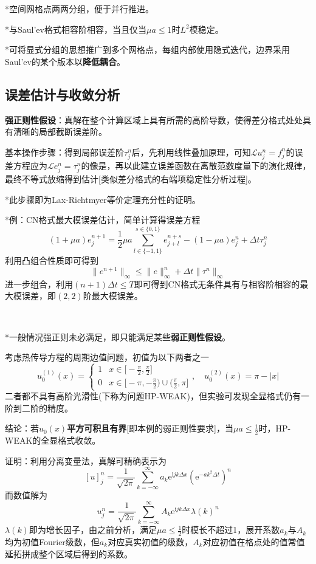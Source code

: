 \documentclass[a4paper,UTF8,fontset=windows]{ctexart}
\begin{document}
*空间网格点两两分组，便于并行推进。

*与Saul'ev格式相容阶相容，当且仅当$\mu a\le1$时$L^2$模稳定。

*可将显式分组的思想推广到多个网格点，每组内部使用隐式迭代，边界采用Saul'ev的某个版本以\textbf{降低耦合}。

\subsection{误差估计与收敛分析}
\textbf{强正则性假设}：真解在整个计算区域上具有所需的高阶导数，使得差分格式处处具有清晰的局部截断误差阶。

基本操作步骤：得到局部误差阶$\tau_j^n$后，先利用线性叠加原理，可知$\mathcal{L}u_j^n=f_j^n$的误差方程应为$\mathcal{L}e_j^n=\tau_j^n$的像是，再以此建立误差函数在离散范数度量下的演化规律，最终不等式放缩得到估计[类似差分格式的右端项稳定性分析过程]。

*此步骤即为Lax-Richtmyer等价定理充分性的证明。

*例：CN格式最大模误差估计，简单计算得误差方程
$$(1+\mu a)e_j^{n+1}=\frac{1}{2}\mu a\sum_{l\in\{-1,1\}}^{s\in\{0,1\}}e_{j+l}^{n+s}-(1-\mu a)e_j^n+\Delta t\tau_j^n$$
利用凸组合性质即可得到
$$\|e^{n+1}\|_\infty\le\|e\|^n_\infty+\Delta t\|\tau^n\|_\infty$$
进一步组合，利用$(n+1)\Delta t\le T$即可得到CN格式无条件具有与相容阶相容的最大模误差，即$(2,2)$阶最大模误差。

\

*一般情况强正则未必满足，即只能满足某些\textbf{弱正则性假设}。

考虑热传导方程的周期边值问题，初值为以下两者之一
$$u_0^{(1)}(x)=\begin{cases}1&x\in\big[-\frac{\pi}{2},\frac{\pi}{2}\big]\\0&x\in\big[-\pi,-\frac{\pi}{2}\big)\cup\big(\frac{\pi}{2},\pi\big]\end{cases},\quad u_0^{(2)}(x)=\pi-|x|$$
二者都不具有高阶光滑性(下称为问题HP-WEAK)，但实验可发现全显格式仍有一阶到二阶的精度。

结论：若$u_0(x)$\textbf{平方可积且有界}[即本例的弱正则性要求]，当$\mu a\le\frac{1}{2}$时，HP-WEAK的全显格式收敛。

证明：利用分离变量法，真解可精确表示为
$$[u]_j^n=\frac{1}{\sqrt{2\pi}}\sum_{k=-\infty}^\infty a_k\mathrm{e}^{\mathrm{i}jk\Delta x}(\mathrm{e}^{-ak^2\Delta t})^n$$
而数值解为
$$u_j^n=\frac{1}{\sqrt{2\pi}}\sum_{k=-\infty}^\infty A_k\mathrm{e}^{\mathrm{i}jk\Delta x}\lambda(k)^n$$
$\lambda(k)$即为增长因子，由之前分析，满足$\mu a\le\frac{1}{2}$时模长不超过1，展开系数$a_k$与$A_k$均为初值Fourier级数，但$a_k$对应真实初值的级数，$A_k$对应初值在格点处的值常值延拓拼成整个区域后得到的系数。
\end{document}
